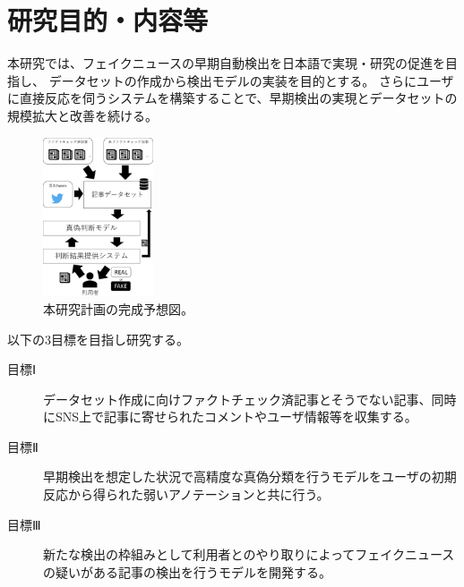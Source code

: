 
\section{研究目的・内容等}

\vspace{20pt}
本研究では、フェイクニュースの早期自動検出を日本語で実現・研究の促進を目指し、
データセットの作成から検出モデルの実装を目的とする。
さらにユーザに直接反応を伺うシステムを構築することで、早期検出の実現とデータセットの規模拡大と改善を続ける。


\setlength\intextsep{0pt}
\setlength\textfloatsep{0pt}
\begin{figure}
    \vspace{-2\baselineskip}
    \centering
    \includegraphics[width=0.29\textwidth]{figs/dataset.pdf}
    \vspace{-1cm} 
    \caption{本研究計画の完成予想図。}
    \label{fig:dataset}
    \vspace{-3\baselineskip}
\end{figure}

以下の3目標を目指し研究する。
\begin{description}
    \item[目標Ⅰ] データセット作成に向けファクトチェック済記事とそうでない記事、同時にSNS上で記事に寄せられたコメントやユーザ情報等を収集する。
    \item[目標Ⅱ] 早期検出を想定した状況で高精度な真偽分類を行うモデルをユーザの初期反応から得られた弱いアノテーションと共に行う。
    \item[目標Ⅲ] 新たな検出の枠組みとして利用者とのやり取りによってフェイクニュースの疑いがある記事の検出を行うモデルを開発する。
\end{description}

